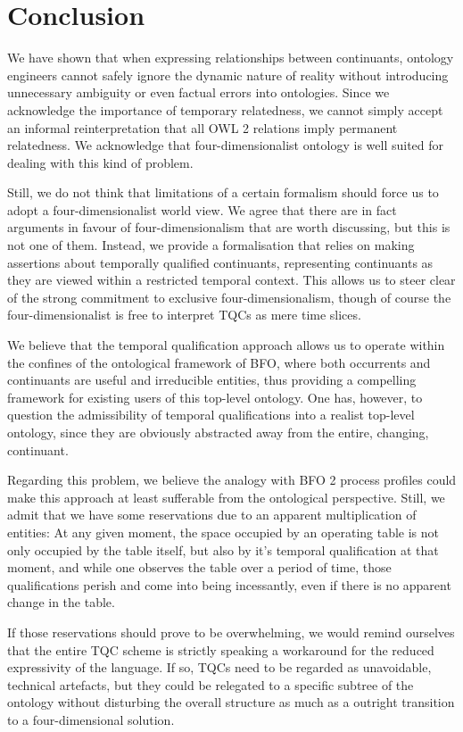 \documentclass{ao2e}
\begin{document}
\section{Conclusion}
We have shown that when expressing relationships between continuants, ontology
engineers cannot safely ignore the dynamic nature of reality without introducing
unnecessary ambiguity or even factual errors into ontologies. Since we
acknowledge the importance of temporary relatedness, we cannot simply accept an
informal reinterpretation that all OWL 2 relations imply permanent relatedness. 
We acknowledge that four-dimensionalist ontology is well suited for
dealing with this kind of problem. 

Still, we do not think that limitations of a certain formalism should force us
to adopt a four-dimensionalist world view. We agree that there are in fact
arguments in favour of four-dimensionalism that are worth discussing, but this is not one of them. 
Instead, we provide a formalisation that relies on making assertions about
temporally qualified continuants, representing continuants as they are viewed
within a restricted temporal context. This allows us to steer clear of the strong
commitment to exclusive four-dimensionalism, though of course the
four-dimensionalist is free to interpret TQCs as mere time slices.

We believe that the temporal qualification approach allows us to operate within
the confines of the ontological framework of BFO, where both occurrents and
continuants are useful and irreducible entities, thus providing a compelling
framework for existing users of this top-level ontology. One has, however, to
question the admissibility of temporal qualifications into a
realist top-level ontology, since they are obviously abstracted away from the
entire, changing, continuant. 

Regarding this problem, we believe the analogy with BFO 2 process profiles could 
make this approach at least sufferable from the
ontological perspective. Still, we admit that we have some reservations due to
an apparent multiplication of entities: At any given moment, the space occupied
by an operating table is not only occupied by the table itself, but also by it's
temporal qualification at that moment, and while one observes the table over a
period of time, those qualifications perish and come
into being incessantly, even if there is no apparent change in the table.  

If those reservations should prove to be overwhelming, we would remind ourselves
that the entire TQC scheme is strictly speaking a workaround for the reduced
expressivity of the language. If so, TQCs  need to be regarded as
unavoidable, technical artefacts, but they could be relegated to a specific
subtree of the ontology without disturbing the overall structure as much as a
outright transition to a four-dimensional solution.
\end{document}

